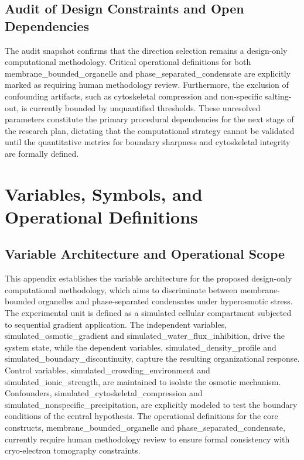 \documentclass[conference]{IEEEtran}
\begin{document}
\subsection{Audit of Design Constraints and Open Dependencies}
The audit snapshot confirms that the direction selection remains a design-only computational methodology. Critical operational definitions for both membrane\_bounded\_organelle and phase\_separated\_condensate are explicitly marked as requiring human methodology review. Furthermore, the exclusion of confounding artifacts, such as cytoskeletal compression and non-specific salting-out, is currently bounded by unquantified thresholds. These unresolved parameters constitute the primary procedural dependencies for the next stage of the research plan, dictating that the computational strategy cannot be validated until the quantitative metrics for boundary sharpness and cytoskeletal integrity are formally defined.

\section{Variables, Symbols, and Operational Definitions}
\subsection{Variable Architecture and Operational Scope}
This appendix establishes the variable architecture for the proposed design-only computational methodology, which aims to discriminate between membrane-bounded organelles and phase-separated condensates under hyperosmotic stress. The experimental unit is defined as a simulated cellular compartment subjected to sequential gradient application. The independent variables, simulated\_osmotic\_gradient and simulated\_water\_flux\_inhibition, drive the system state, while the dependent variables, simulated\_density\_profile and simulated\_boundary\_discontinuity, capture the resulting organizational response. Control variables, simulated\_crowding\_environment and simulated\_ionic\_strength, are maintained to isolate the osmotic mechanism. Confounders, simulated\_cytoskeletal\_compression and simulated\_nonspecific\_precipitation, are explicitly modeled to test the boundary conditions of the central hypothesis. The operational definitions for the core constructs, membrane\_bounded\_organelle and phase\_separated\_condensate, currently require human methodology review to ensure formal consistency with cryo-electron tomography constraints.
\end{document}

